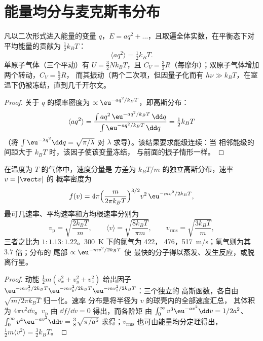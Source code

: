 \section{能量均分与麦克斯韦分布}

\begin{theorem}[能量均分定理]\label{thm:b2:boltzmann-factor:equipartition}
凡以二次形式进入能量的变量 $q$，$E = aq^2 +
\dots$，且取遍全体实数，在平衡态下对
平均能量的贡献为 $\tfrac12k_BT$：
\[
\langle aq^2\rangle = \tfrac12k_BT .
\]
单原子气体（三个平动）有 $U = \tfrac32Nk_BT$，且 $C_V =
\tfrac32R$（每摩尔）；双原子气体增加两个转动，$C_V = \tfrac52R$，
而其振动（两个二次项，但因量子化而有 $h\nu \gg
k_BT$，在室温下仍被冻结，直到几千开尔文。
\end{theorem}

\begin{proof}
关于 $q$ 的概率密度为 $\propto\eu^{-aq^2/k_BT}$，即高斯分布：
\[
\langle aq^2\rangle = \frac{\int aq^2\,\eu^{-aq^2/k_BT}\,\dd q}{\int\eu^{-aq^2/k_BT}\,\dd q} = \tfrac12k_BT
\]
（将 $\int\eu^{-\lambda q^2}\dd q = \sqrt{\pi/\lambda}$ 对
$\lambda$ 求导）。该结果要求能级连续：当
相邻能级的间距大于 $k_BT$ 时，该因子使该变量冻结，
与前面的振子情形一样。
\end{proof}

\begin{theorem}[麦克斯韦速率分布]\label{thm:b2:boltzmann-factor:maxwell}
在温度为 $T$ 的气体中，速度分量是
方差为 $k_BT/m$ 的独立高斯分布，速率 $v = |\vect v|$ 的
概率密度为
\[
f(v) = 4\pi\Big(\frac{m}{2\pi k_BT}\Big)^{3/2}v^2\,\eu^{-mv^2/2k_BT} ,
\]
最可几速率、平均速率和方均根速率分别为
\[
v_{\text{p}} = \sqrt{\frac{2k_BT}{m}}, \qquad
\langle v\rangle = \sqrt{\frac{8k_BT}{\pi m}}, \qquad
v_{\text{rms}} = \sqrt{\frac{3k_BT}{m}} ,
\]
三者之比为 $1 : 1.13 : 1.22$。\qty{300}{K} 下的氮气为 \qty{422}{}，
\qty{476}{}，\qty{517}{m/s}；氢气则为其 $3.7$ 倍；分布的
尾部 $\propto\eu^{-mv^2/2k_BT}$ 使
最快的分子得以蒸发、发生反应，或脱离行星。
\end{theorem}

\begin{proof}
动能 $\tfrac12m(v_x^2 + v_y^2 + v_z^2)$ 给出因子
$\eu^{-mv_x^2/2k_BT}\eu^{-mv_y^2/2k_BT}\eu^{-mv_z^2/2k_BT}$：三个独立的
高斯函数，各自由 $\sqrt{m/2\pi k_BT}$ 归一化。速率
分布是将半径为 $v$ 的球壳内的全部速度汇总，
其体积为 $4\pi v^2\dd v$。$v_{\text{p}}$ 由 $\dd f/\dd v = 0$ 得出，而各阶矩
由 $\int_0^\infty v^3\eu^{-av^2}\dd v = 1/2a^2$、$\int_0^\infty
v^4\eu^{-av^2}\dd v = \tfrac38\sqrt{\pi/a^5}$ 求得；$v_{\text{rms}}$ 也可由能量均分定理得出，
$\tfrac12m\langle v^2\rangle = \tfrac32k_BT$。
\end{proof}

